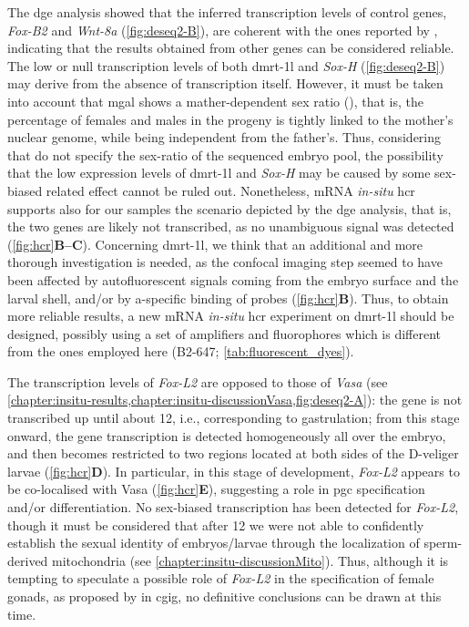 The \gls{dge} analysis showed that the inferred transcription levels of control genes, \textit{Fox-B2} and \textit{Wnt-8a} (\cref{fig:deseq2-B}), are coherent with the ones reported by , indicating that the results obtained from other genes can be considered reliable. The low or null transcription levels of both \gls{dmrt-1l} and \textit{Sox-H} (\cref{fig:deseq2-B}) may derive from the absence of transcription itself. However, it must be taken into account that \gls{mgal} shows a mather-dependent sex ratio (), that is, the percentage of females and males in the progeny is tightly linked to the mother's nuclear genome, while being independent from the father's. Thus, considering that  do not specify the sex-ratio of the sequenced embryo pool, the possibility that the low expression levels of \gls{dmrt-1l} and \textit{Sox-H} may be caused by some sex-biased related effect cannot be ruled out. Nonetheless, mRNA \textit{in-situ} \gls{hcr} supports also for our samples the scenario depicted by the \gls{dge} analysis, that is, the two genes are likely not transcribed, as no unambiguous signal was detected (\cref{fig:hcr}\textbf{B--C}). Concerning \gls{dmrt-1l}, we think that an additional and more thorough investigation is needed, as the confocal imaging step seemed to have been affected by autofluorescent signals coming from the embryo surface and the larval shell, and/or by a-specific binding  of probes (\cref{fig:hcr}\textbf{B}). Thus, to obtain more reliable results, a new mRNA \textit{in-situ} \gls{hcr} experiment on \gls{dmrt-1l} should be designed, possibly using a set of amplifiers and fluorophores which is different from the ones employed here (B2-647; \cref{tab:fluorescent_dyes}).

The transcription levels of \textit{Fox-L2} are opposed to those of \textit{Vasa} (see \cref{chapter:insitu-results,chapter:insitu-discussionVasa,fig:deseq2-A}): the gene is not transcribed up until about \qty{12}{\hpf}, i.e., corresponding to gastrulation; from this stage onward, the gene transcription is detected homogeneously all over the embryo, and then becomes restricted to two regions located at both sides of the D-veliger larvae (\cref{fig:hcr}\textbf{D}). In particular, in this stage of development, \textit{Fox-L2} appears to be co-localised with Vasa (\cref{fig:hcr}\textbf{E}), suggesting a role in \gls{pgc} specification and/or differentiation. No sex-biased transcription has been detected for \textit{Fox-L2}, though it must be considered that after \qty{12}{\hpf} we were not able to confidently establish the sexual identity of embryos/larvae through the localization of sperm-derived mitochondria (see \cref{chapter:insitu-discussionMito}). Thus, although it is tempting to speculate a possible role of \textit{Fox-L2} in the specification of female gonads, as proposed by  in \gls{cgig}, no definitive conclusions can be drawn at this time.

